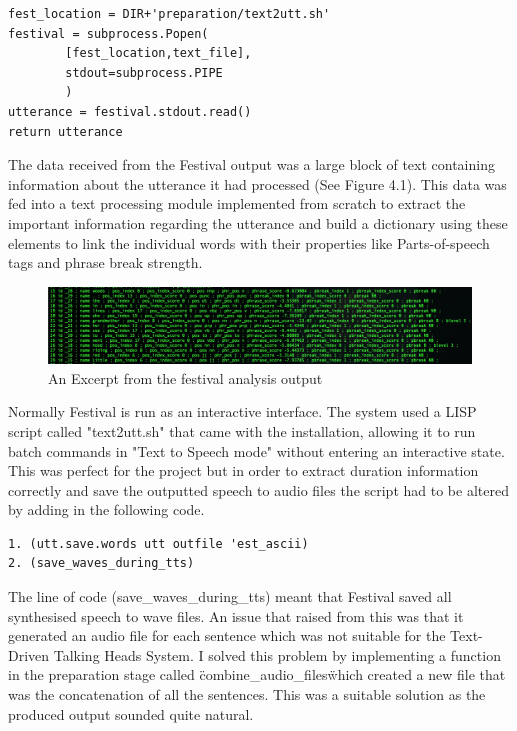 \documentclass[bsc,frontabs,twoside,singlespacing,parskip]{infthesis}
\begin{document}
\begin{lstlisting}
fest_location = DIR+'preparation/text2utt.sh'
festival = subprocess.Popen(
		[fest_location,text_file], 
		stdout=subprocess.PIPE
		)
utterance = festival.stdout.read()
return utterance
\end{lstlisting}

The data received from the Festival output was a large block of text containing information about the utterance it had processed (See Figure 4.1). This data was fed into a text processing module implemented from scratch to extract the important information regarding the utterance and build a dictionary using these elements to link the individual words with their properties like Parts-of-speech tags and phrase break strength.

\begin{figure}
	\includegraphics[width=1.0\textwidth]{festival_output.png}
	\caption{An Excerpt from the festival analysis output}
\end{figure}

Normally Festival is run as an interactive interface. The system used a LISP script called "text2utt.sh" that came with the installation, allowing it to run batch commands in "Text to Speech mode" without entering an interactive state. This was perfect for the project but in order to extract duration information correctly and save the outputted speech to audio files the script had to be altered by adding in the following code. 

\begin{lstlisting}
1. (utt.save.words utt outfile 'est_ascii) 
2. (save_waves_during_tts)
\end{lstlisting}

The line of code (save\_waves\_during\_tts) meant that Festival saved all synthesised speech to wave files. An issue that raised from this was that it generated an audio file for each sentence which was not suitable for the Text-Driven Talking Heads System. I solved this problem by implementing a function in the preparation stage called \"combine\_audio\_files\" which created a new file that was the concatenation of all the sentences. This was a suitable solution as the produced output sounded quite natural.
\end{document}
